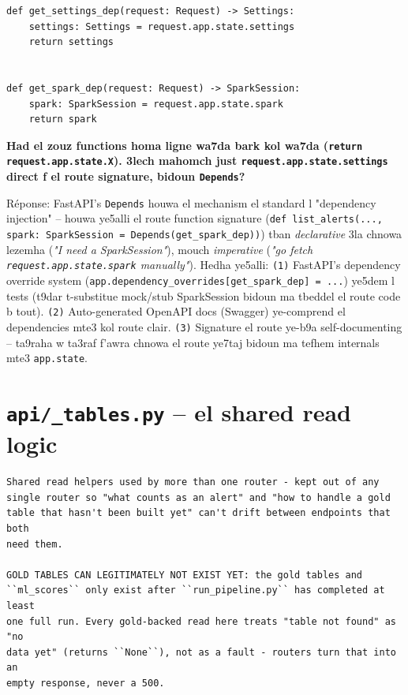 \documentclass[11pt,a4paper]{report}
\DeclareRobustCommand{\code}[1]{\texttt{#1}}
\DeclareRobustCommand{\file}[1]{\texttt{\color{amber}#1}}
\begin{document}
\begin{lstlisting}[style=pystyle]
def get_settings_dep(request: Request) -> Settings:
    settings: Settings = request.app.state.settings
    return settings


def get_spark_dep(request: Request) -> SparkSession:
    spark: SparkSession = request.app.state.spark
    return spark
\end{lstlisting}

\begin{soual}
\textbf{Had el zouz functions homa ligne wa7da bark kol wa7da (\code{return
request.app.state.X}). 3lech mahomch just \code{request.app.state.settings}
direct f el route signature, bidoun \code{Depends}?}

Réponse: FastAPI's \code{Depends} houwa el mechanism el standard l
"dependency injection" -- houwa ye5alli el route function signature
(\code{def list\_alerts(..., spark: SparkSession = Depends(get\_spark\_dep))})
tban \emph{declarative} 3la chnowa lezemha (\emph{"I need a SparkSession"}),
mouch \emph{imperative} (\emph{"go fetch \code{request.app.state.spark}
manually"}). Hedha ye5alli: \code{(1)} FastAPI's dependency override system
(\code{app.dependency\_overrides[get\_spark\_dep] = ...}) ye5dem l tests
(t9dar t-substitue mock/stub SparkSession bidoun ma tbeddel el route code
b tout). \code{(2)} Auto-generated OpenAPI docs (Swagger) ye-comprend
el dependencies mte3 kol route clair. \code{(3)} Signature el route
ye-b9a self-documenting -- ta9raha w ta3raf f'awra chnowa el route
ye7taj bidoun ma tefhem internals mte3 \code{app.state}.
\end{soual}

\section{\file{api/\_tables.py} -- el shared read logic}

\begin{lstlisting}[style=pystyle]
Shared read helpers used by more than one router - kept out of any
single router so "what counts as an alert" and "how to handle a gold
table that hasn't been built yet" can't drift between endpoints that both
need them.

GOLD TABLES CAN LEGITIMATELY NOT EXIST YET: the gold tables and
``ml_scores`` only exist after ``run_pipeline.py`` has completed at least
one full run. Every gold-backed read here treats "table not found" as "no
data yet" (returns ``None``), not as a fault - routers turn that into an
empty response, never a 500.
\end{lstlisting}
\end{document}
